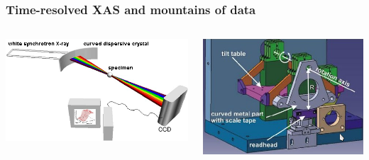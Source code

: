 \documentclass[10pt, xcolor=x11names, compress]{beamer}
\begin{document}
\begin{frame}
  \frametitle{Time-resolved XAS and mountains of data}

  \begin{columns}[T]
    \begin{column}{0.55\linewidth}
      \includegraphics[width=0.8\linewidth]{images/ede.png}
    \end{column}
    \begin{column}{0.42\linewidth}
      \includegraphics[width=0.8\linewidth]{images/qxas_mono.png}
    \end{column}
  \end{columns}


\end{frame}
\end{document}
